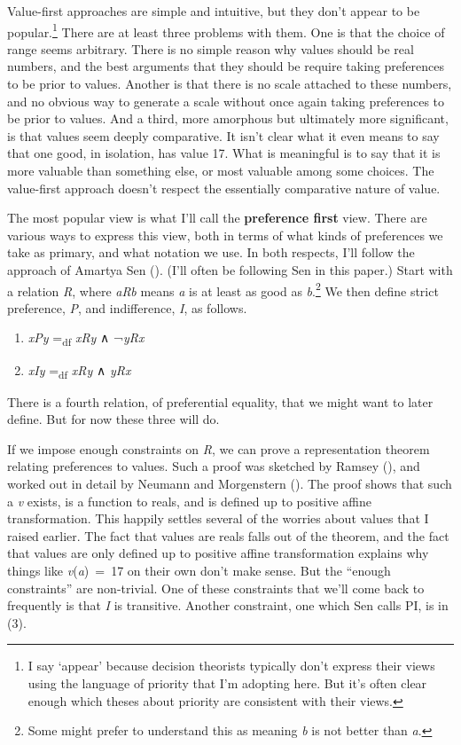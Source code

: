 \documentclass[
  12pt,
  letterpaper,
  DIV=11,
  numbers=noendperiod]{scrartcl}
\providecommand{\tightlist}{%
  \setlength{\itemsep}{0pt}\setlength{\parskip}{0pt}}
\begin{document}
Value-first approaches are simple and intuitive, but they don't appear
to be popular.\footnote{I say `appear' because decision theorists
  typically don't express their views using the language of priority
  that I'm adopting here. But it's often clear enough which theses about
  priority are consistent with their views.} There are at least three
problems with them. One is that the choice of range seems arbitrary.
There is no simple reason why values should be real numbers, and the
best arguments that they should be require taking preferences to be
prior to values. Another is that there is no scale attached to these
numbers, and no obvious way to generate a scale without once again
taking preferences to be prior to values. And a third, more amorphous
but ultimately more significant, is that values seem deeply comparative.
It isn't clear what it even means to say that one good, in isolation,
has value 17. What is meaningful is to say that it is more valuable than
something else, or most valuable among some choices. The value-first
approach doesn't respect the essentially comparative nature of value.

The most popular view is what I'll call the \textbf{preference first}
view. There are various ways to express this view, both in terms of what
kinds of preferences we take as primary, and what notation we use. In
both respects, I'll follow the approach of Amartya Sen
(). (I'll often be
following Sen in this paper.) Start with a relation \emph{R}, where
\emph{aRb} means \emph{a} is at least as good as \emph{b}.\footnote{Some
  might prefer to understand this as meaning \emph{b} is not better than
  \emph{a}.} We then define strict preference, \emph{P}, and
indifference, \emph{I}, as follows.

\begin{enumerate}
\def\labelenumi{(\arabic{enumi})}
\tightlist
\item
  \emph{xPy} =\textsubscript{df} \emph{xRy} ∧ ¬\emph{yRx}
\item
  \emph{xIy} =\textsubscript{df} \emph{xRy} ∧ \emph{yRx}
\end{enumerate}

There is a fourth relation, of preferential equality, that we might want
to later define. But for now these three will do.

If we impose enough constraints on \emph{R}, we can prove a
representation theorem relating preferences to values. Such a proof was
sketched by Ramsey (), and worked
out in detail by Neumann and Morgenstern ().
The proof shows that such a \emph{v} exists, is a function to reals, and
is defined up to positive affine transformation. This happily settles
several of the worries about values that I raised earlier. The fact that
values are reals falls out of the theorem, and the fact that values are
only defined up to positive affine transformation explains why things
like \emph{v}(\emph{a})~=~17 on their own don't make sense. But the
``enough constraints'' are non-trivial. One of these constraints that
we'll come back to frequently is that \emph{I} is transitive. Another
constraint, one which Sen calls PI, is in (3).
\end{document}
